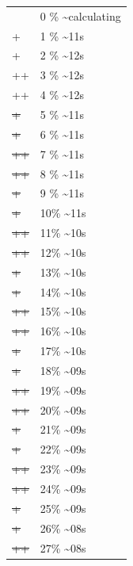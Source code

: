 \documentclass[12pt]{article}
\begin{document}
\begin{center}
\begin{tabular}{ll}
 & 0 \% \textasciitilde{}calculating\\
+ & 1 \% \textasciitilde{}11s\\
+ & 2 \% \textasciitilde{}12s\\
++ & 3 \% \textasciitilde{}12s\\
++ & 4 \% \textasciitilde{}12s\\
\sout{+} & 5 \% \textasciitilde{}11s\\
\sout{+} & 6 \% \textasciitilde{}11s\\
\sout{++} & 7 \% \textasciitilde{}11s\\
\sout{++} & 8 \% \textasciitilde{}11s\\
\sout{\sout{+}} & 9 \% \textasciitilde{}11s\\
\sout{\sout{+}} & 10\% \textasciitilde{}11s\\
\sout{\sout{++}} & 11\% \textasciitilde{}10s\\
\sout{\sout{++}} & 12\% \textasciitilde{}10s\\
\sout{\sout{\sout{+}}} & 13\% \textasciitilde{}10s\\
\sout{\sout{\sout{+}}} & 14\% \textasciitilde{}10s\\
\sout{\sout{\sout{++}}} & 15\% \textasciitilde{}10s\\
\sout{\sout{\sout{++}}} & 16\% \textasciitilde{}10s\\
\sout{\sout{\sout{\sout{+}}}} & 17\% \textasciitilde{}10s\\
\sout{\sout{\sout{\sout{+}}}} & 18\% \textasciitilde{}09s\\
\sout{\sout{\sout{\sout{++}}}} & 19\% \textasciitilde{}09s\\
\sout{\sout{\sout{\sout{++}}}} & 20\% \textasciitilde{}09s\\
\sout{\sout{\sout{\sout{\sout{+}}}}} & 21\% \textasciitilde{}09s\\
\sout{\sout{\sout{\sout{\sout{+}}}}} & 22\% \textasciitilde{}09s\\
\sout{\sout{\sout{\sout{\sout{++}}}}} & 23\% \textasciitilde{}09s\\
\sout{\sout{\sout{\sout{\sout{++}}}}} & 24\% \textasciitilde{}09s\\
\sout{\sout{\sout{\sout{\sout{\sout{+}}}}}} & 25\% \textasciitilde{}09s\\
\sout{\sout{\sout{\sout{\sout{\sout{+}}}}}} & 26\% \textasciitilde{}08s\\
\sout{\sout{\sout{\sout{\sout{\sout{++}}}}}} & 27\% \textasciitilde{}08s\\

\end{tabular}
\end{center}
\end{document}
